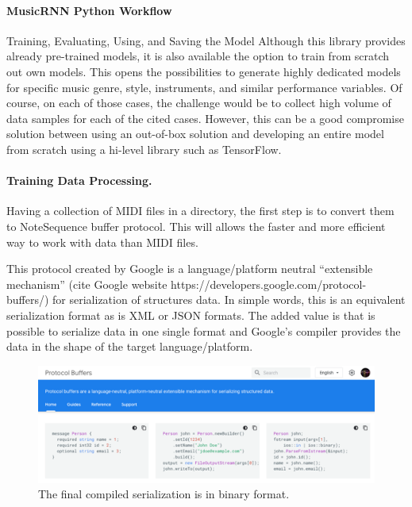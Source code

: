 \paragraph{MusicRNN Python Workflow} Training, Evaluating, Using, and Saving the Model
Although this library provides already pre-trained models, it is also available the option
to train from scratch out own models. This opens the possibilities to generate highly
dedicated models for specific music genre, style, instruments, and similar performance
variables. Of course, on each of those cases, the challenge would be to collect high
volume of data samples for each of the cited cases. However, this can be a good compromise
solution between using an out-of-box solution and developing an entire model from scratch
using a hi-level library such as TensorFlow.

\paragraph{Training Data Processing.} Having a collection of MIDI files in a directory,
the first step is to convert them to NoteSequence buffer protocol. This will allows the
faster and more efficient way to work with data than MIDI files.

This protocol created by Google is a language/platform neutral “extensible mechanism”
(cite Google website https://developers.google.com/protocol-buffers/) for serialization of
structures data. In simple words, this is an equivalent serialization format as is XML or
JSON formats. The added value is that is possible to serialize data in one single format
and Google’s compiler provides the data in the shape of the target language/platform.

\label{figure:protobuf}
\begin{figure}[h!]
  \caption{The final compiled serialization is in binary format.}
  \includegraphics[width=\linewidth]{image/fig_JDF31.png}
\end{figure}

